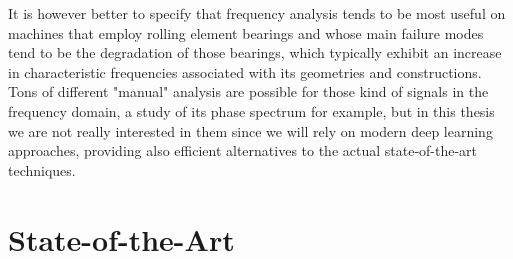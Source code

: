 \documentclass[../main.tex]{subfiles}
\begin{document}
It is however better to specify that frequency analysis tends to be most useful on machines that employ rolling element bearings and whose main failure modes tend to be the degradation of those bearings, which typically exhibit an increase in characteristic frequencies associated with its geometries and constructions.\\
Tons of different "manual" analysis are possible for those kind of signals in the frequency domain, a study of its phase spectrum for example, but in this thesis we are not really interested in them since we will rely on modern deep learning approaches, providing also efficient alternatives to the actual state-of-the-art techniques.


\section{State-of-the-Art}
\end{document}
